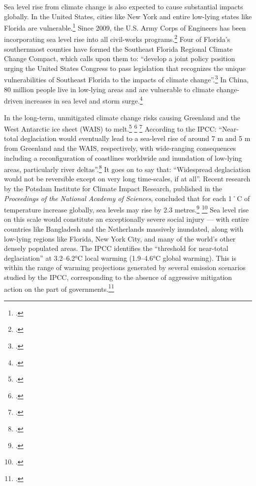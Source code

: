 \documentclass[10pt]{article}
\begin{document}
Sea level rise from climate change is also expected to cause substantial impacts globally.
In the United States, cities like New York and entire low-lying states like Florida are vulnerable.\footcite[][]{EconGetWet}
Since 2009, the U.S. Army Corps of Engineers has been incorporating sea level rise into all civil-works programs.\footcite[][]{CorpsEngSeaLevel}
Four of Florida's southernmost counties have formed the Southeast Florida Regional Climate Change Compact, which calls upon them to: ``develop a joint policy position urging the United States Congress to pass legislation that recognizes the unique vulnerabilities of Southeast Florida to the impacts of climate change''.\footcite[][]{SouthEastFloridaCompact}
In China, 80 million people live in low-lying areas and are vulnerable to climate change-driven increases in sea level and storm surge.\footcite[][p. 19]{EastGrey2013}



In the long-term, unmitigated climate change risks causing Greenland and the West Antarctic ice sheet (WAIS) to melt.\footcite[See: ][]{Goelzer2013} \footcite[][]{GreenlandContribution2013} \footcite[][]{Nghiem2012}
According to the IPCC: ``Near-total deglaciation would eventually lead to a sea-level rise of around 7 m and 5 m from Greenland and the WAIS, respectively, with wide-ranging consequences including a reconfiguration of coastlines worldwide and inundation of low-lying areas, particularly river deltas''.\footcite[][See: "Deglaciation of West Antarctic and Greenland ice sheets" \url{https://www.ipcc.ch/publications_and_data/ar4/wg2/en/ch19s19-3-5-2.html}]{IPCC2007}
It goes on to say that: ``Widespread deglaciation would not be reversible except on very long time-scales, if at all''.
Recent research by the Potsdam Institute for Climate Impact Research, published in the \emph{Proceedings of the National Academy of Sciences}, concluded that for each 1˚C of temperature increase globally, sea levels may rise by 2.3 metres.\footcite[][]{PotsdamSeaLevelReport} \footcite[See also: ][]{TwoPointThreeMetres}
Sea level rise on this scale would constitute an exceptionally severe social injury --- with entire countries like Bangladesh and the Netherlands massively inundated, along with low-lying regions like Florida, New York City, and many of the world's other densely populated areas.
The IPCC identifies the ``threshold for near-total deglaciation'' at 3.2--6.2°C local warming (1.9--4.6°C global warming).
This is within the range of warming projections generated by several emission scenarios studied by the IPCC, corresponding to the absence of aggressive mitigation action on the part of governments.\footcite[][See: "Projected climate change an its impacts" \url{https://www.ipcc.ch/publications_and_data/ar4/syr/en/spms3.html}"]{IPCC2007}
\end{document}
